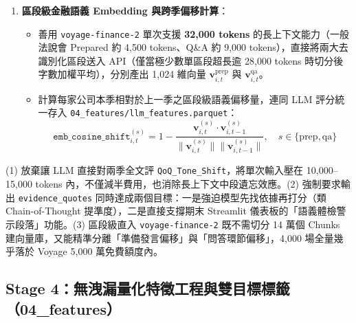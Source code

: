 \documentclass[11pt, a4paper]{article}
\begin{document}
\begin{enumerate}[leftmargin=1.5em, itemsep=2pt]
\begin{itemize}[leftmargin=1.2em]
\begin{enumerate}[leftmargin=1.4em, itemsep=1pt]
        \end{enumerate}
        \item \textbf{選配進階校準（Logprobs 連續化）}：若欲驗證連續分數增益，可針對最核心的 \texttt{optimism\_score} 或 \texttt{qa\_evasiveness}，使用支援完整 \texttt{logprobs} 之端點（如 OpenAI \texttt{gpt-4o-mini}）以單一離散分類 token（\texttt{1}--\texttt{5}）呼叫，計算期望值 $\hat{s} = \sum_{k=1}^{5} p(k) \cdot k$。
        \item 所有 API 回傳結果即時以 Append-Only 寫入 \texttt{api\_extract\_cache.jsonl} 並同步更新 \texttt{pipeline\_state.sqlite}，搭配 \texttt{asyncio.Semaphore(15)} 與指數退避重試機制。
    \end{itemize}
    \item \textbf{區段級金融語義 Embedding 與跨季偏移計算}：
    \begin{itemize}[leftmargin=1.2em]
        \item 善用 \texttt{voyage-finance-2} 單次支援 \textbf{32,000 tokens} 的長上下文能力（一般法說會 Prepared 約 4,500 tokens、Q\&A 約 9,000 tokens），直接將兩大去識別化區段送入 API（僅當極少數單區段超長逾 28,000 tokens 時切分後字數加權平均），分別產出 1,024 維向量 $\mathbf{v}^{\text{prep}}_{i,t}$ 與 $\mathbf{v}^{\text{qa}}_{i,t}$。
        \item 計算每家公司本季相對於上一季之區段級語義偏移量，連同 LLM 評分統一存入 \texttt{04\_features/llm\_features.parquet}：
        \[
            \texttt{emb\_cosine\_shift}^{(s)}_{i,t} = 1 - \frac{\mathbf{v}^{(s)}_{i,t} \cdot \mathbf{v}^{(s)}_{i,t-1}}{\|\mathbf{v}^{(s)}_{i,t}\| \|\mathbf{v}^{(s)}_{i,t-1}\|}, \quad s \in \{\text{prep}, \text{qa}\}
        \]
    \end{itemize}
\end{enumerate}

\begin{whybox}
(1) 放棄讓 LLM 直接對兩季全文評 \texttt{QoQ\_Tone\_Shift}，將單次輸入壓在 10,000--15,000 tokens 內，不僅減半費用，也消除長上下文中段遺忘效應。(2) 強制要求輸出 \texttt{evidence\_quotes} 同時達成兩個目標：一是強迫模型先找依據再打分（類 Chain-of-Thought 提準度），二是直接支撐期末 Streamlit 儀表板的「語義體檢警示段落」功能。(3) 區段級直入 \texttt{voyage-finance-2} 既不需切分 14 萬個 Chunks 建向量庫，又能精準分離「準備發言偏移」與「問答環節偏移」，4,000 場全量幾乎落於 Voyage 5,000 萬免費額度內。
\end{whybox}

\subsection{Stage 4：無洩漏量化特徵工程與雙目標標籤（04\_features）}
\end{document}
